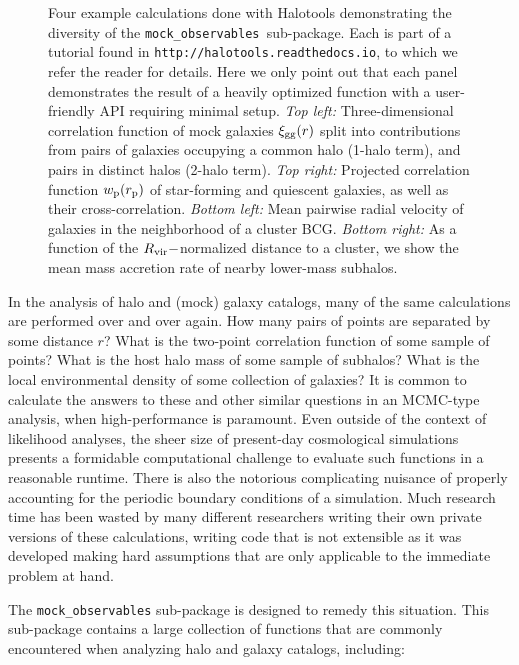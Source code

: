 \documentclass[usenatbib,usegraphicx,letterpaper]{mn2e}
\newcommand{\rproj}{r_{\rm p}}
\newcommand{\mockobs}{{\tt mock\_observables }}
\begin{document}
\begin{figure}
\begin{center}
\caption{
Four example calculations done with Halotools demonstrating the diversity of the \mockobs sub-package. Each is part of a tutorial found in {\tt http://halotools.readthedocs.io}, to which we refer the reader for details. Here we only point out that each panel demonstrates the result of a heavily optimized function with a user-friendly API requiring minimal setup. {\em Top left:} Three-dimensional correlation function of mock galaxies $\xi_{\rm gg}(r)$ split into contributions from pairs of galaxies occupying a common halo (1-halo term), and pairs in distinct halos (2-halo term). {\em Top right:} Projected correlation function $w_{\rm p}(\rproj)$ of star-forming and quiescent galaxies, as well as their cross-correlation. {\em Bottom left:} Mean pairwise radial velocity of galaxies in the neighborhood of a cluster BCG. {\em Bottom right:} As a function of the $R_{\rm vir}-$normalized distance to a cluster, we show the mean mass accretion rate of nearby lower-mass subhalos. 
}
\label{fig:satcen}
\end{center}
\end{figure}

In the analysis of halo and (mock) galaxy catalogs, many of the same calculations are performed over and over again. How many pairs of points are separated by some distance $r$? What is the two-point correlation function of some sample of points? What is the host halo mass of some sample of subhalos? What is the local environmental density of some collection of galaxies? It is common to calculate the answers to these and other similar questions in an MCMC-type analysis, when high-performance is paramount. Even outside of the context of likelihood analyses, the sheer size of present-day cosmological simulations presents a formidable computational challenge to evaluate such functions in a reasonable runtime. There is also the notorious complicating nuisance of properly accounting for the periodic boundary conditions of a simulation. Much research time has been wasted by many different researchers writing their own private versions of these calculations, writing code that is not extensible as it was developed making hard assumptions that are only applicable to the immediate problem at hand. 

The {\tt mock\_observables} sub-package is designed to remedy this situation. This sub-package contains a large collection of functions that are commonly encountered when analyzing halo and galaxy catalogs, including:
\end{document}
